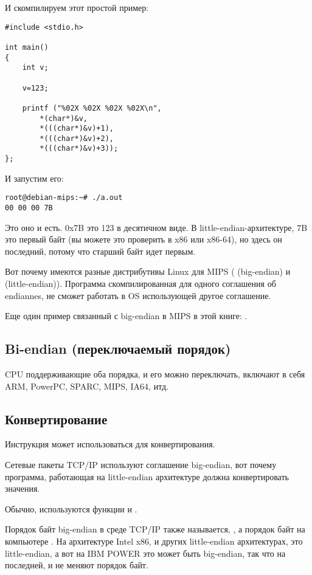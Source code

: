 И скомпилируем этот простой пример:

\begin{lstlisting}[style=customc]
#include <stdio.h>

int main()
{
	int v;

	v=123;

	printf ("%02X %02X %02X %02X\n", 
		*(char*)&v,
		*(((char*)&v)+1),
		*(((char*)&v)+2),
		*(((char*)&v)+3));
};
\end{lstlisting}

И запустим его:

\begin{lstlisting}
root@debian-mips:~# ./a.out 
00 00 00 7B
\end{lstlisting}

Это оно и есть.
0x7B это 123 в десятичном виде.
В little-endian-архитектуре, 7B это первый байт (вы можете это проверить в x86 или x86-64),
но здесь он последний, потому что старший байт идет первым.

Вот почему имеются разные дистрибутивы Linux для MIPS
( (big-endian) и  (little-endian)).
Программа скомпилированная для одного соглашения об endiannes, не сможет работать в OS использующей
другое соглашение.

Еще один пример связанный с big-endian в MIPS в этой книге: .

\subsection{Bi-endian (переключаемый порядок)}

CPU поддерживающие оба порядка, и его можно переключать, включают в себя ARM, PowerPC, SPARC, MIPS, \ac{IA64}, итд.

\subsection{Конвертирование}

Инструкция  может использоваться для конвертирования.

Сетевые пакеты TCP/IP используют соглашение big-endian, вот почему программа, работающая на little-endian архитектуре
должна конвертировать значения.

Обычно, используются функции  и .

Порядок байт big-endian в среде TCP/IP также называется, ,
а порядок байт на компьютере .
На архитектуре Intel x86, и других little-endian архитектурах,  это little-endian, 
а вот на IBM POWER это может быть big-endian, так что на последней, 
 и  не меняют порядок байт.

